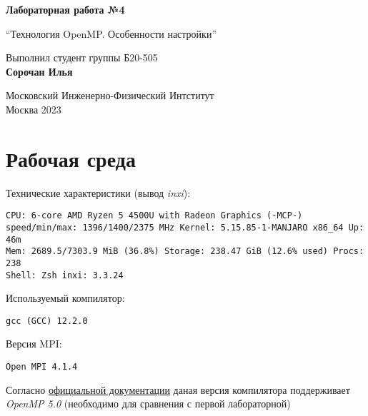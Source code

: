 \documentclass[a4paper, 12pt]{article}
\begin{document}
\hypersetup{pageanchor=false}
\begin{titlepage}
 \begin{center}
  \vspace*{1cm}

  \Huge
  \textbf{Лабораторная работа №4}

  \vspace{0.5cm}
  \LARGE
  ``Технология OpenMP. Особенности настройки''

  \vspace{1.5cm}
  Выполнил студент группы Б20-505\\
  \textbf{Сорочан Илья}

  \vfill

  \Large
  Московский Инженерно-Физический Интститут\\
  Москва 2023

 \end{center}
\end{titlepage}



\section{Рабочая среда}

Технические характеристики (вывод \textit{inxi}):
\begin{verbatim}
CPU: 6-core AMD Ryzen 5 4500U with Radeon Graphics (-MCP-)
speed/min/max: 1396/1400/2375 MHz Kernel: 5.15.85-1-MANJARO x86_64 Up: 46m
Mem: 2689.5/7303.9 MiB (36.8%) Storage: 238.47 GiB (12.6% used) Procs: 238
Shell: Zsh inxi: 3.3.24
\end{verbatim}

Используемый компилятор:
\begin{verbatim}
gcc (GCC) 12.2.0
\end{verbatim}

Версия MPI:
\begin{verbatim}
Open MPI 4.1.4
\end{verbatim}

Согласно \href{https://www.openmp.org/resources/openmp-compilers-tools/}{официальной документации} даная версия компилятора поддерживает \textit{OpenMP 5.0} (необходимо для сравнения с первой лабораторной)


\end{document}
